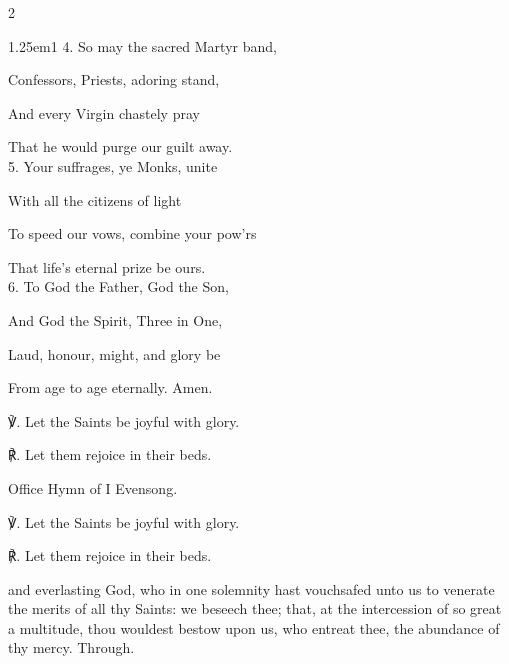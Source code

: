 \begin{paracol}{2}
\begin{hangparas}{1.25em}{1}
4. So may the sacred Martyr band,

Confessors, Priests, adoring stand,

And every Virgin chastely pray

That he would purge our guilt away.\\

5. Your suffrages, ye Monks, unite

With all the citizens of light

To speed our vows, combine your pow'rs

That life’s eternal prize be ours.\\

6. To God the Father, God the Son,

And God the Spirit, Three in One,

Laud, honour, might, and glory be

From age to age eternally. Amen.\\
\end{hangparas}

℣. Let the Saints be joyful with glory.

℟. Let them rejoice in their beds.


\fussy	
\end{paracol}


\secondEvensong
{}

\begin{rubric}
	Office Hymn of I Evensong.
\end{rubric}

℣. Let the Saints be joyful with glory.

℟. Let them rejoice in their beds.



\collect
{} and everlasting God, who in one solemnity hast vouchsafed unto us to venerate the merits of all thy Saints: we beseech thee; that, at the intercession of so great a multitude, thou wouldest bestow upon us, who entreat thee, the abundance of thy mercy. Through.

